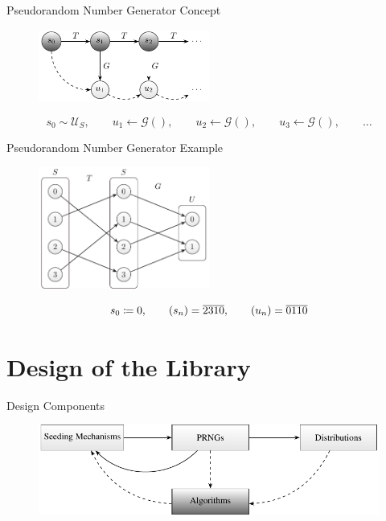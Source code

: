 \documentclass[aspectratio=169]{beamer}
\begin{document}
    \begin{frame}{Pseudorandom Number Generator Concept}
      \begin{figure}
        \includegraphics[width=0.5\textwidth]{figures/sequence_generation_scheme.pdf}
      \end{figure}
      \vfill
      \begin{mybox}
        \[
          s_0 \sim \mathscr{U}_S,\qquad
          u_1 \leftarrow \mathscr{G}(),\qquad
          u_2 \leftarrow \mathscr{G}(),\qquad
          u_3 \leftarrow \mathscr{G}(),\qquad \ldots
        \]
      \end{mybox}
    \end{frame}

    \begin{frame}{Pseudorandom Number Generator Example}
      \begin{figure}
        \includegraphics[width=0.5\textwidth]{figures/prng_example.pdf}
      \end{figure}
      \begin{mybox}
        \[
          s_0 \coloneqq 0, \qquad
          (s_n) = \overline{2310}, \qquad
          (u_n) = \overline{0110}
        \]
      \end{mybox}
    \end{frame}

  \section{Design of the Library} %
  \label{sec:design}
    \begin{frame}{Design Components}
      \begin{figure}
        \includegraphics[width=\textwidth]{figures/api_parts.pdf}
      \end{figure}
    \end{frame}
\end{document}
